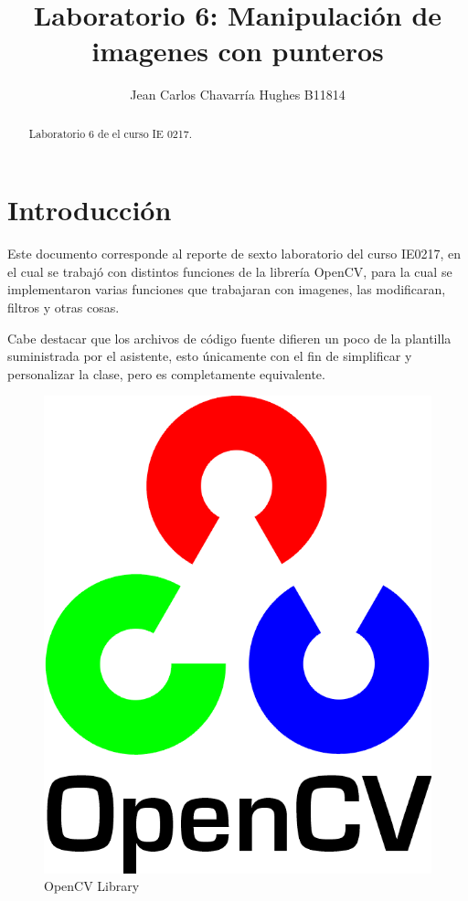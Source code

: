 \documentclass{article}
\begin{document}
\title{Laboratorio 6: Manipulaci\' on de imagenes con punteros}
\author{Jean Carlos Chavarr\' ia Hughes B11814}
\maketitle
\begin{abstract}
Laboratorio 6 de el curso IE 0217.
\end{abstract}
\section{Introducci\' on}
Este documento corresponde al reporte de sexto laboratorio del curso IE0217, en el cual se trabaj\' o con distintos funciones de la librer\' ia OpenCV, para la cual se implementaron varias funciones que trabajaran con imagenes, las modificaran, filtros y otras cosas.

Cabe destacar que los archivos de c\' odigo fuente difieren un poco de la plantilla suministrada por el asistente, esto \' unicamente con el fin de simplificar y personalizar la clase, pero es completamente equivalente.

\begin{figure}[hbtp]
\caption{OpenCV Library}
\centering
\includegraphics[scale=1]{imagenes/OpenCV_Logo_with_text.png}
\end{figure}
\end{document}
